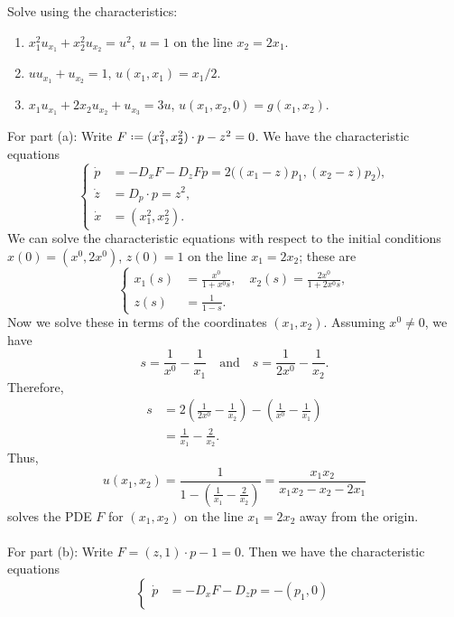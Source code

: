 \begin{problem}
  Solve using the characteristics:
  \begin{enumerate}[label=(\alph*)]
  \item \(x_1^2u_{x_1}+x_2^2u_{x_2}=u^2\), \(u=1\) on the line
    \(x_2=2x_1\).
  \item \(uu_{x_1}+u_{x_2}=1\), \(u(x_1,x_1)=x_1/2\).
  \item \(x_1u_{x_1}+2x_2u_{x_2}+u_{x_3}=3u\),
    \(u(x_1,x_2,0)=g(x_1,x_2)\).
  \end{enumerate}
\end{problem}
\begin{solution*}
  For part (a): Write \(F\defeq (x_1^2,x_2^2)\cdot p-z^2=0\). We have the
  characteristic equations
  \[
    \left\{
      \begin{aligned}
        \dot p&=-D_xF-D_zFp=2\bigl((x_1-z)p_1,(x_2-z)p_2\bigr),\\
        \dot z&=D_p\cdot p=z^2,\\
        \dot x&=(x_1^2,x_2^2).
      \end{aligned}
    \right.
  \]
  We can solve the characteristic equations with respect to the initial
  conditions \(x(0)=(x^0,2x^0)\), \(z(0)=1\) on the line \(x_1=2x_2\);
  these are
  \[
    \left\{
      \begin{aligned}
        x_1(s)&=\frac{x^0}{1+x^0s},\quad
        x_2(s)=\frac{2x^0}{1+2x^0s},\\
        z(s)&=\frac{1}{1-s}.
      \end{aligned}
    \right.
  \]
  Now we solve these in terms of the coordinates \((x_1,x_2)\). Assuming
  \(x^0\neq 0\), we have
  \[
    s=\frac{1}{x^0}-\frac{1}{x_1}\quad
    \text{and}\quad
    s=\frac{1}{2x^0}-\frac{1}{x_2}.
  \]
  Therefore,
  \begin{align*}
    s
    &=2\left(\frac{1}{2x^0}-\frac{1}{x_2}\right)
      -\left(\frac{1}{x^0}-\frac{1}{x_1}\right)\\
    &=\frac{1}{x_1}-\frac{2}{x_2}.
  \end{align*}
  Thus,
  \[
    u(x_1,x_2)=
    \frac{1}{1-\left(\frac{1}{x_1}-\frac{2}{x_2}\right)}=%
    \frac{x_1x_2}{x_1x_2-x_2-2x_1}
  \]
  solves the PDE \(F\) for \((x_1,x_2)\) on the line \(x_1=2x_2\) away from
  the origin.
  \\\\
  For part (b): Write \(F=(z,1)\cdot p-1=0\).  Then we have the
  characteristic equations
  \[
    \left\{
      \begin{aligned}
        \dot p&=-D_xF-D_z p=-(p_1,0)\\

\end{aligned}\]
\end{solution*}
